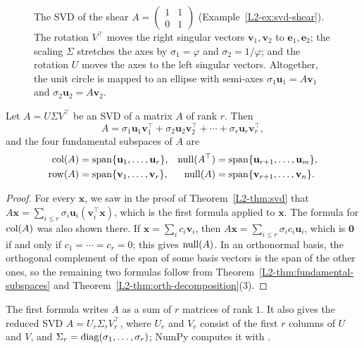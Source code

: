\begin{figure}[ht]
    \caption[The geometry of the SVD]{The SVD of the shear $A = \begin{pmatrix} 1 & 1 \\ 0 & 1 \end{pmatrix}$ (Example~\ref{L2-ex:svd-shear}). The rotation $V^\top$ moves the right singular vectors $\mathbf{v}_1, \mathbf{v}_2$ to $\mathbf{e}_1, \mathbf{e}_2$; the scaling $\Sigma$ stretches the axes by $\sigma_1 = \varphi$ and $\sigma_2 = 1/\varphi$; and the rotation $U$ moves the axes to the left singular vectors. Altogether, the unit circle is mapped to an ellipse with semi-axes $\sigma_1 \mathbf{u}_1 = A\mathbf{v}_1$ and $\sigma_2 \mathbf{u}_2 = A\mathbf{v}_2$.}
    \label{L2-fig:svd}
\end{figure}

\begin{proposition}\label{L2-prop:svd-subspaces}
    Let $A = U\Sigma V^\top$ be an SVD of a matrix $A$ of rank $r$. Then
    \[A = \sigma_1 \mathbf{u}_1 \mathbf{v}_1^\top + \sigma_2 \mathbf{u}_2 \mathbf{v}_2^\top + \cdots + \sigma_r \mathbf{u}_r \mathbf{v}_r^\top,\]
    and the four fundamental subspaces of $A$ are
    \begin{align*}
        \operatorname{col}(A) &= \operatorname{span}\{\mathbf{u}_1, \ldots, \mathbf{u}_r\}, & \operatorname{null}(A^\top) &= \operatorname{span}\{\mathbf{u}_{r+1}, \ldots, \mathbf{u}_m\}, \\
        \operatorname{row}(A) &= \operatorname{span}\{\mathbf{v}_1, \ldots, \mathbf{v}_r\}, & \operatorname{null}(A) &= \operatorname{span}\{\mathbf{v}_{r+1}, \ldots, \mathbf{v}_n\}.
    \end{align*}
\end{proposition}

\begin{proof}
    For every $\mathbf{x}$, we saw in the proof of Theorem~\ref{L2-thm:svd} that $A\mathbf{x} = \sum_{i \leq r} \sigma_i \mathbf{u}_i (\mathbf{v}_i^\top \mathbf{x})$, which is the first formula applied to $\mathbf{x}$. The formula for $\operatorname{col}(A)$ was also shown there. If $\mathbf{x} = \sum_i c_i \mathbf{v}_i$, then $A\mathbf{x} = \sum_{i \leq r} \sigma_i c_i \mathbf{u}_i$, which is $\mathbf{0}$ if and only if $c_1 = \cdots = c_r = 0$; this gives $\operatorname{null}(A)$. In an orthonormal basis, the orthogonal complement of the span of some basis vectors is the span of the other ones, so the remaining two formulas follow from Theorem~\ref{L2-thm:fundamental-subspaces} and Theorem~\ref{L2-thm:orth-decomposition}(3).
\end{proof}

The first formula writes $A$ as a sum of $r$ matrices of rank $1$. It also gives the reduced SVD $A = U_r \Sigma_r V_r^\top$, where $U_r$ and $V_r$ consist of the first $r$ columns of $U$ and $V$, and $\Sigma_r = \operatorname{diag}(\sigma_1, \ldots, \sigma_r)$; NumPy computes it with .

